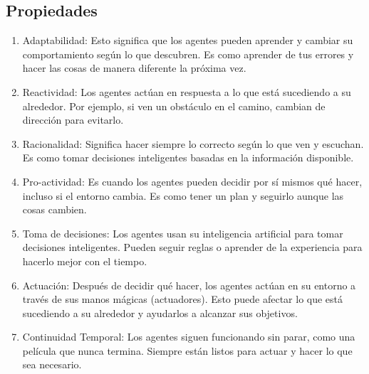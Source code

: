 \subsection*{Propiedades}

\begin{enumerate}
    \item Adaptabilidad: Esto significa que los agentes pueden aprender y cambiar su comportamiento 
    según lo que descubren. Es como aprender de tus errores y hacer las cosas de 
    manera diferente la próxima vez.

    \item Reactividad: Los agentes actúan en respuesta a lo que está sucediendo a su alrededor. 
    Por ejemplo, si ven un obstáculo en el camino, cambian de dirección para evitarlo.
    
    \item Racionalidad: Significa hacer siempre lo correcto según lo que ven y escuchan. Es como 
    tomar decisiones inteligentes basadas en la información disponible.
    
    \item Pro-actividad: Es cuando los agentes pueden decidir por sí mismos qué hacer, incluso si 
    el entorno cambia. Es como tener un plan y seguirlo aunque las cosas cambien.
    
    \item Toma de decisiones: Los agentes usan su inteligencia artificial para tomar decisiones 
    inteligentes. Pueden seguir reglas o aprender de la experiencia para hacerlo mejor con el tiempo.
    
    \item Actuación: Después de decidir qué hacer, los agentes actúan en su entorno a través de 
    sus manos mágicas (actuadores). Esto puede afectar lo que está sucediendo a su alrededor y 
    ayudarlos a alcanzar sus objetivos.
    
    \item Continuidad Temporal: Los agentes siguen funcionando sin parar, como una película que 
    nunca termina. Siempre están listos para actuar y hacer lo que sea necesario.
    

\end{enumerate}
